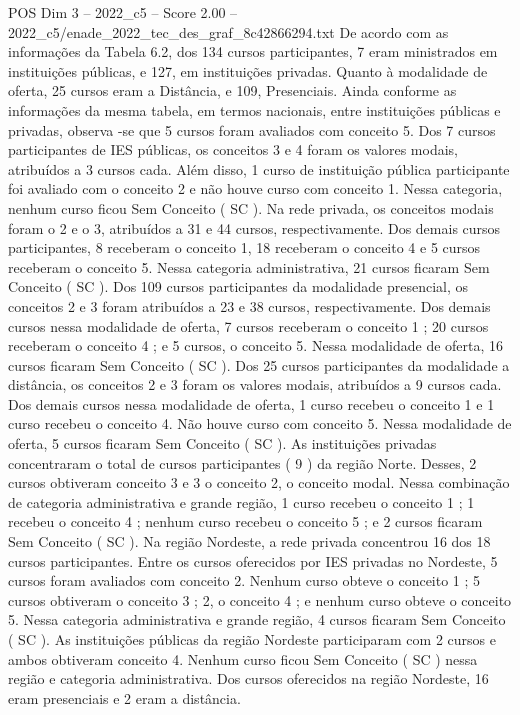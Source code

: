 \begin{textsample}{POS Dim 3 – 2022\_c5 – Score 2.00 – 2022\_c5/enade\_2022\_tec\_des\_graf\_8c42866294.txt}
De acordo com as informações da Tabela 6.2, dos 134 cursos participantes, 7 eram ministrados em instituições públicas, e 127, em instituições privadas.
Quanto à modalidade de oferta, 25 cursos eram a Distância, e 109, Presenciais.
Ainda conforme as informações da mesma tabela, em termos nacionais, entre instituições públicas e privadas, observa -se que 5 cursos foram avaliados com conceito 5.
Dos 7 cursos participantes de IES públicas, os conceitos 3 e 4 foram os valores modais, atribuídos a 3 cursos cada.
Além disso, 1 curso de instituição pública participante foi avaliado com o conceito 2 e não houve curso com conceito 1.
Nessa categoria, nenhum curso ficou Sem Conceito ( SC ).
Na rede privada, os conceitos modais foram o 2 e o 3, atribuídos a 31 e 44 cursos, respectivamente.
Dos demais cursos participantes, 8 receberam o conceito 1, 18 receberam o conceito 4 e 5 cursos receberam o conceito 5.
Nessa categoria administrativa, 21 cursos ficaram Sem Conceito ( SC ).
Dos 109 cursos participantes da modalidade presencial, os conceitos 2 e 3 foram atribuídos a 23 e 38 cursos, respectivamente.
Dos demais cursos nessa modalidade de oferta, 7 cursos receberam o conceito 1 ; 20 cursos receberam o conceito 4 ; e 5 cursos, o conceito 5.
Nessa modalidade de oferta, 16 cursos ficaram Sem Conceito ( SC ).
Dos 25 cursos participantes da modalidade a distância, os conceitos 2 e 3 foram os valores modais, atribuídos a 9 cursos cada.
Dos demais cursos nessa modalidade de oferta, 1 curso recebeu o conceito 1 e 1 curso recebeu o conceito 4.
Não houve curso com conceito 5.
Nessa modalidade de oferta, 5 cursos ficaram Sem Conceito ( SC ).
As instituições privadas concentraram o total de cursos participantes ( 9 ) da região Norte.
Desses, 2 cursos obtiveram conceito 3 e 3 o conceito 2, o conceito modal.
Nessa combinação de categoria administrativa e grande região, 1 curso recebeu o conceito 1 ; 1 recebeu o conceito 4 ; nenhum curso recebeu o conceito 5 ; e 2 cursos ficaram Sem Conceito ( SC ).
Na região Nordeste, a rede privada concentrou 16 dos 18 cursos participantes.
Entre os cursos oferecidos por IES privadas no Nordeste, 5 cursos foram avaliados com conceito 2.
Nenhum curso obteve o conceito 1 ; 5 cursos obtiveram o conceito 3 ; 2, o conceito 4 ; e nenhum curso obteve o conceito 5.
Nessa categoria administrativa e grande região, 4 cursos ficaram Sem Conceito ( SC ).
As instituições públicas da região Nordeste participaram com 2 cursos e ambos obtiveram conceito 4.
Nenhum curso ficou Sem Conceito ( SC ) nessa região e categoria administrativa.
Dos cursos oferecidos na região Nordeste, 16 eram presenciais e 2 eram a distância.

\end{textsample}
